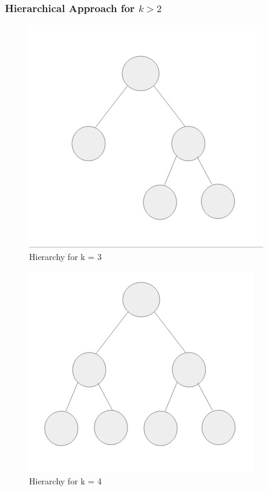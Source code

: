 \documentclass[10pt]{beamer}
\begin{document}
\begin{frame}
\frametitle{Hierarchical Approach for $k>2$}

\begin{figure}
  \centering
 \includegraphics[scale=0.9]{three_comm.jpg}
 \caption{Hierarchy for k = 3}
\end{figure}

\begin{figure}
  \centering
 \includegraphics[scale=.9]{four_comm.jpg}
 \caption{Hierarchy for k = 4}
\end{figure}

\end{frame}
\end{document}
